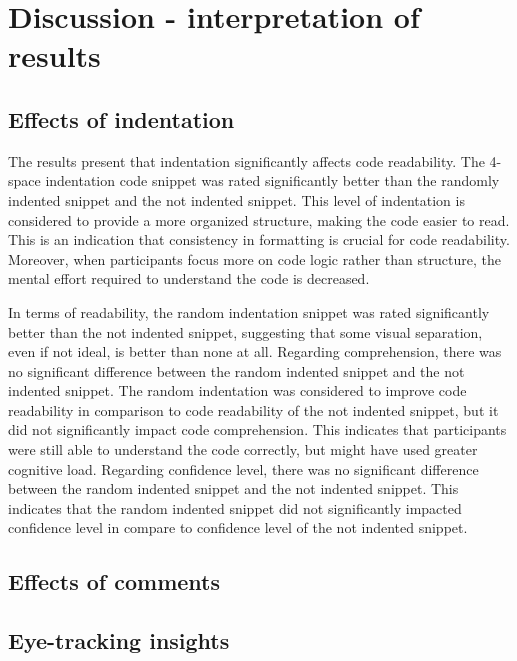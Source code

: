 \chapter{Discussion - interpretation of results}



\section{Effects of indentation} 
The results present that indentation significantly affects code readability. The 4-space indentation code snippet was rated significantly better than the randomly indented snippet and the not indented snippet. This level of indentation is considered to provide a more organized structure, making the code easier to read. This is an indication that consistency in formatting is crucial for code readability.   Moreover, when participants focus more on code logic rather than structure, the mental effort required to understand the code is decreased. 


In terms of readability, the random indentation snippet was rated significantly better than the not indented snippet, suggesting that some visual separation, even if not ideal, is better than none at all.  Regarding comprehension, there was no significant difference between the random indented snippet and the not indented snippet. The random indentation was considered to improve code readability in comparison to code readability of the not indented snippet, but it did not significantly impact code comprehension.  This indicates that participants were still able to understand the code correctly, but might have used greater cognitive load. Regarding confidence level, there was no significant difference between the random indented snippet and the not indented snippet. This indicates that the random indented snippet did not significantly impacted confidence level in compare to confidence level of the not indented snippet. 


\section{Effects of comments} 
\section{Eye-tracking insights} 

